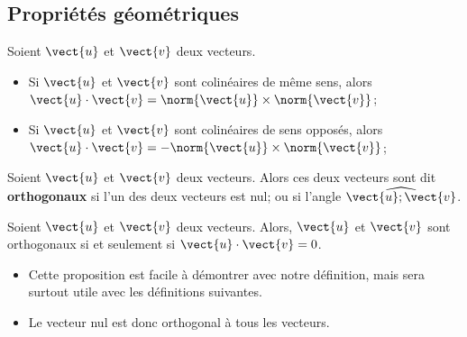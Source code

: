 \documentclass{article}
\begin{document}
\subsection{Propriétés géométriques}
\begin{proposition}
Soient $\vect{u}$ et $\vect{v}$ deux vecteurs.
\begin{itemize}
\item Si $\vect{u}$ et $\vect{v}$ sont colinéaires de même sens, alors $\vect{u} \cdot \vect{v} = \norm{\vect{u}} \times \norm{\vect{v}}$; 
\item Si $\vect{u}$ et $\vect{v}$ sont colinéaires de sens opposés, alors $\vect{u} \cdot \vect{v} = - \norm{\vect{u}} \times \norm{\vect{v}}$; 
\end{itemize}    
\end{proposition}
\begin{tcolorbox}
\begin{definition}
Soient $\vect{u}$ et $\vect{v}$ deux vecteurs. Alors ces deux vecteurs sont dit \textbf{orthogonaux} si l'un des deux vecteurs est nul; ou si l'angle $\widehat{\vect{u};\vect{v}}$.
\end{definition}
\end{tcolorbox}
\begin{proposition}
Soient $\vect{u}$ et $\vect{v}$ deux vecteurs. Alors, $\vect{u}$ et $\vect{v}$ sont orthogonaux si et seulement si $\vect{u} \cdot \vect{v} = 0$.    
\end{proposition}
\begin{remark}
\begin{itemize}
\item Cette proposition est facile à démontrer avec notre définition, mais sera surtout utile avec les définitions suivantes.
\item Le vecteur nul est donc orthogonal à tous les vecteurs.
\end{itemize}
\end{remark}
\end{document}
